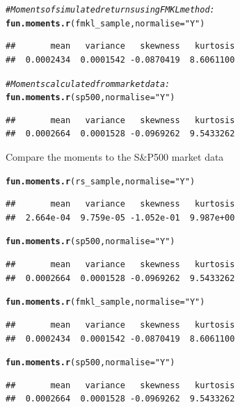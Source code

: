 \documentclass[12pt, a4paper, oneside]{article}\usepackage[]{graphicx}\usepackage[]{color}
\makeatletter
\newcommand{\hlstr}[1]{\textcolor[rgb]{0.192,0.494,0.8}{#1}}%
\newcommand{\hlcom}[1]{\textcolor[rgb]{0.678,0.584,0.686}{\textit{#1}}}%
\newcommand{\hlkwd}[1]{\textcolor[rgb]{0.737,0.353,0.396}{\textbf{#1}}}%
\newenvironment{kframe}{%
 \def\at@end@of@kframe{}%
 \ifinner\ifhmode%
  \def\at@end@of@kframe{\end{minipage}}%
  \begin{minipage}{\columnwidth}%
 \fi\fi%
 \def\FrameCommand##1{\hskip\@totalleftmargin \hskip-\fboxsep
 \colorbox{shadecolor}{##1}\hskip-\fboxsep
     \hskip-\linewidth \hskip-\@totalleftmargin \hskip\columnwidth}%
 \MakeFramed {\advance\hsize-\width
   \@totalleftmargin\z@ \linewidth\hsize
   \@setminipage}}%
 {\par\unskip\endMakeFramed%
 \at@end@of@kframe}
\newenvironment{knitrout}{}{} %
\makeatother
\begin{document}
\begin{knitrout}
\begin{kframe}
\begin{alltt}
\hlcom{# Moments of simulated returns using FMKL method:}
\hlkwd{fun.moments.r}(fmkl_sample, normalise = \hlstr{"Y"})
\end{alltt}
\begin{verbatim}
##       mean   variance   skewness   kurtosis 
##  0.0002434  0.0001542 -0.0870419  8.6061100
\end{verbatim}
\begin{alltt}

\hlcom{# Moments calculated from market data:}
\hlkwd{fun.moments.r}(sp500, normalise = \hlstr{"Y"})
\end{alltt}
\begin{verbatim}
##       mean   variance   skewness   kurtosis 
##  0.0002664  0.0001528 -0.0969262  9.5433262
\end{verbatim}
\end{kframe}
\end{knitrout}

Compare the moments to the S\&P500 market data
\begin{knitrout}
\color{fgcolor}\begin{kframe}
\begin{alltt}
\hlkwd{fun.moments.r}(rs_sample, normalise = \hlstr{"Y"})
\end{alltt}
\begin{verbatim}
##       mean   variance   skewness   kurtosis 
##  2.664e-04  9.759e-05 -1.052e-01  9.987e+00
\end{verbatim}
\begin{alltt}
\hlkwd{fun.moments.r}(sp500, normalise = \hlstr{"Y"})
\end{alltt}
\begin{verbatim}
##       mean   variance   skewness   kurtosis 
##  0.0002664  0.0001528 -0.0969262  9.5433262
\end{verbatim}
\begin{alltt}
\hlkwd{fun.moments.r}(fmkl_sample, normalise = \hlstr{"Y"})
\end{alltt}
\begin{verbatim}
##       mean   variance   skewness   kurtosis 
##  0.0002434  0.0001542 -0.0870419  8.6061100
\end{verbatim}
\begin{alltt}
\hlkwd{fun.moments.r}(sp500, normalise = \hlstr{"Y"})
\end{alltt}
\begin{verbatim}
##       mean   variance   skewness   kurtosis 
##  0.0002664  0.0001528 -0.0969262  9.5433262
\end{verbatim}
\end{kframe}
\end{knitrout}
\end{document}
